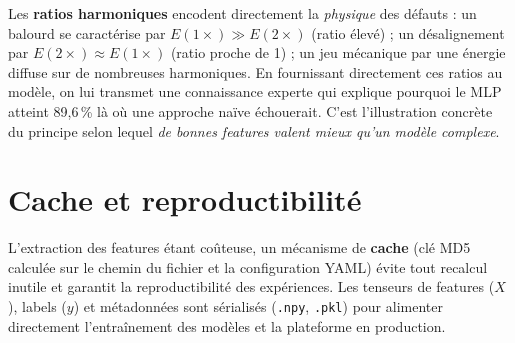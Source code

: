 Les \textbf{ratios harmoniques} encodent directement la \emph{physique} des défauts : un
balourd se caractérise par $E(1\times) \gg E(2\times)$ (ratio élevé) ; un désalignement par
$E(2\times) \approx E(1\times)$ (ratio proche de 1) ; un jeu mécanique par une énergie diffuse
sur de nombreuses harmoniques. En fournissant directement ces ratios au modèle, on lui
transmet une connaissance experte qui explique pourquoi le MLP atteint 89{,}6\,\% là où une
approche naïve échouerait. C'est l'illustration concrète du principe selon lequel
\emph{de bonnes features valent mieux qu'un modèle complexe}.

\section{Cache et reproductibilité}
L'extraction des features étant coûteuse, un mécanisme de \textbf{cache} (clé MD5 calculée sur
le chemin du fichier et la configuration YAML) évite tout recalcul inutile et garantit la
reproductibilité des expériences. Les tenseurs de features ($X$), labels ($y$) et métadonnées
sont sérialisés (\texttt{.npy}, \texttt{.pkl}) pour alimenter directement l'entraînement des
modèles et la plateforme en production.
